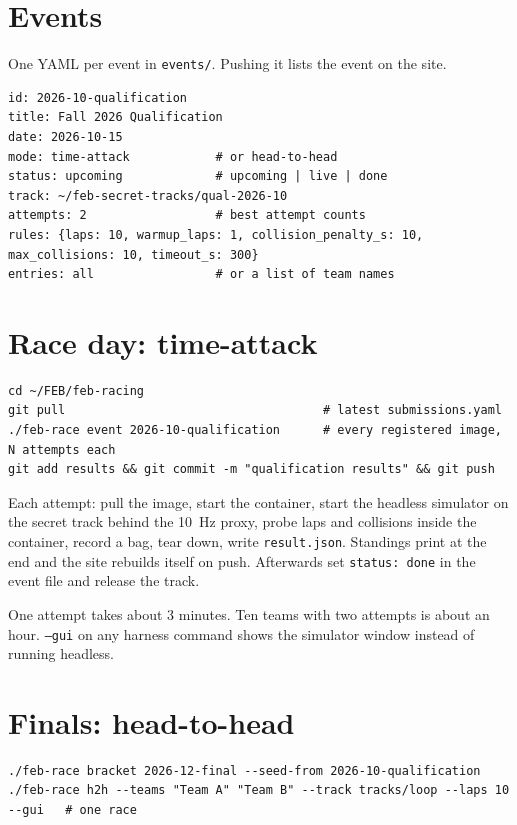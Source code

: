 \documentclass[11pt,a4paper]{article}
\newcommand{\file}[1]{\texttt{#1}}
\newcommand{\cmd}[1]{\texttt{#1}}
\begin{document}
\section{Events}

One YAML per event in \file{events/}. Pushing it lists the event on the site.

\begin{lstlisting}
id: 2026-10-qualification
title: Fall 2026 Qualification
date: 2026-10-15
mode: time-attack            # or head-to-head
status: upcoming             # upcoming | live | done
track: ~/feb-secret-tracks/qual-2026-10
attempts: 2                  # best attempt counts
rules: {laps: 10, warmup_laps: 1, collision_penalty_s: 10, max_collisions: 10, timeout_s: 300}
entries: all                 # or a list of team names
\end{lstlisting}

\section{Race day: time-attack}

\begin{lstlisting}
cd ~/FEB/feb-racing
git pull                                    # latest submissions.yaml
./feb-race event 2026-10-qualification      # every registered image, N attempts each
git add results && git commit -m "qualification results" && git push
\end{lstlisting}

Each attempt: pull the image, start the container, start the headless simulator on the
secret track behind the 10~Hz proxy, probe laps and collisions inside the container, record a
bag, tear down, write \file{result.json}. Standings print at the end and the site rebuilds
itself on push. Afterwards set \texttt{status: done} in the event file and release the track.

One attempt takes about 3 minutes. Ten teams with two attempts is about an hour.
\cmd{--gui} on any harness command shows the simulator window instead of running headless.

\section{Finals: head-to-head}

\begin{lstlisting}
./feb-race bracket 2026-12-final --seed-from 2026-10-qualification
./feb-race h2h --teams "Team A" "Team B" --track tracks/loop --laps 10 --gui   # one race
\end{lstlisting}
\end{document}
